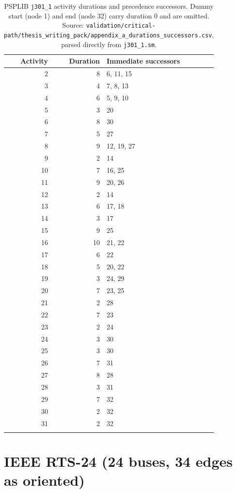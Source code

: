 \documentclass[12pt]{report}
\providecommand{\filepath}[1]{\nolinkurl{#1}}
\begin{document}
{\footnotesize
\begin{longtable}{@{}r r p{7cm}@{}}
\toprule
Activity & Duration & Immediate successors \\
\midrule
\endhead
2 & 8 & 6, 11, 15 \\
3 & 4 & 7, 8, 13 \\
4 & 6 & 5, 9, 10 \\
5 & 3 & 20 \\
6 & 8 & 30 \\
7 & 5 & 27 \\
8 & 9 & 12, 19, 27 \\
9 & 2 & 14 \\
10 & 7 & 16, 25 \\
11 & 9 & 20, 26 \\
12 & 2 & 14 \\
13 & 6 & 17, 18 \\
14 & 3 & 17 \\
15 & 9 & 25 \\
16 & 10 & 21, 22 \\
17 & 6 & 22 \\
18 & 5 & 20, 22 \\
19 & 3 & 24, 29 \\
20 & 7 & 23, 25 \\
21 & 2 & 28 \\
22 & 7 & 23 \\
23 & 2 & 24 \\
24 & 3 & 30 \\
25 & 3 & 30 \\
26 & 7 & 31 \\
27 & 8 & 28 \\
28 & 3 & 31 \\
29 & 7 & 32 \\
30 & 2 & 32 \\
31 & 2 & 32 \\
\bottomrule
\caption{PSPLIB \filepath{j301_1} activity durations and precedence successors. Dummy
start (node 1) and end (node 32) carry duration 0 and are omitted. Source:
\filepath{validation/critical-path/thesis\_writing\_pack/appendix\_a\_durations\_successors.csv},
parsed directly from \filepath{j301_1.sm}.}
\label{tab:appA-psplib}
\end{longtable}}

\section{IEEE RTS-24 (24 buses, 34 edges as oriented)}
\label{sec:appA-rts24}
\end{document}
